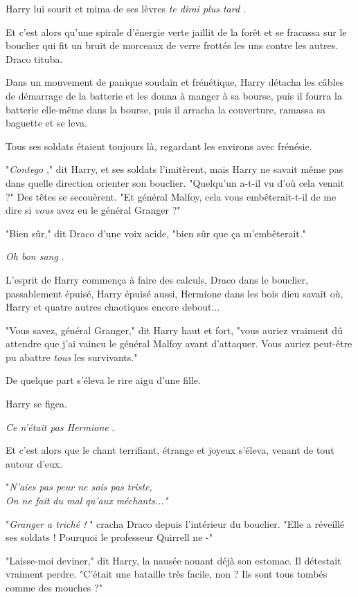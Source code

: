 Harry lui sourit et mima de ses lèvres \emph{te dirai plus tard} .

Et c'est alors qu'une spirale d'énergie verte jaillit de la forêt et se fracassa sur le bouclier qui fit un bruit de morceaux de verre frottés les uns contre les autres. Draco tituba.

Dans un mouvement de panique soudain et frénétique, Harry détacha les câbles de démarrage de la batterie et les donna à manger à sa bourse, puis il fourra la batterie elle-même dans la bourse, puis il arracha la couverture, ramassa sa baguette et se leva.

Tous ses soldats étaient toujours là, regardant les environs avec frénésie.

"\emph{Contego} ," dit Harry, et ses soldats l'imitèrent, mais Harry ne savait même pas dans quelle direction orienter son bouclier. "Quelqu'un a-t-il vu d'où cela venait ?" Des têtes se secouèrent. "Et général Malfoy, cela vous embêterait-t-il de me dire si \emph{vous}  avez eu le général Granger ?"

"Bien sûr," dit Draco d'une voix acide, "bien sûr que ça m'embêterait."

\emph{Oh bon sang} .

L'esprit de Harry commença à faire des calculs, Draco dans le bouclier, passablement épuisé, Harry épuisé aussi, Hermione dans les bois dieu savait où, Harry et quatre autres chaotiques encore debout...

"Vous savez, général Granger," dit Harry haut et fort, "vous auriez vraiment dû attendre que j'ai vaincu le général Malfoy avant d'attaquer. Vous auriez peut-être pu abattre \emph{tous}  les survivants."

De quelque part s'éleva le rire aigu d'une fille.

Harry se figea.

\emph{Ce n'était pas Hermione} .

Et c'est alors que le chant terrifiant, étrange et joyeux s'éleva, venant de tout autour d'eux.

"\emph{N'aies pas peur ne sois pas triste,} \\\emph{} \emph{On ne fait du mal qu'aux méchants..."} 

"\emph{Granger a triché !} " cracha Draco depuis l'intérieur du bouclier. "Elle a réveillé ses soldats ! Pourquoi le professeur Quirrell ne -"

"Laisse-moi deviner," dit Harry, la nausée nouant déjà son estomac. Il détestait vraiment perdre. "C'était une bataille très facile, non ? Ils sont tous tombés comme des mouches ?"

